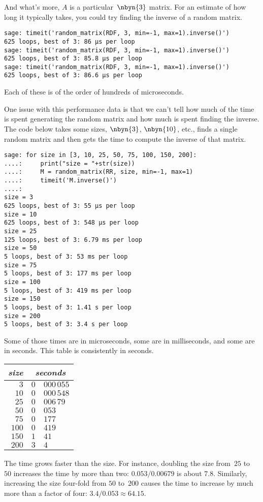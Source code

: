 And what's more, $A$ is a particular~$\nbyn{3}$ matrix. 
For an estimate of
how long it typically takes,
you could try finding the inverse of a random matrix.
\begin{lstlisting}
sage: timeit('random_matrix(RDF, 3, min=-1, max=1).inverse()')
625 loops, best of 3: 86 μs per loop
sage: timeit('random_matrix(RDF, 3, min=-1, max=1).inverse()')
625 loops, best of 3: 85.8 μs per loop
sage: timeit('random_matrix(RDF, 3, min=-1, max=1).inverse()')
625 loops, best of 3: 86.6 μs per loop
\end{lstlisting}
Each of these is of the order of hundreds of microseconds.

One issue with this performance data is that
we can't tell
how much of the time is spent generating
the random matrix and how much is spent finding the inverse.
The code below takes some sizes, $\nbyn{3}$, $\nbyn{10}$, etc.,
finds a single random matrix and then 
gets the time to compute the inverse of that matrix.
\begin{lstlisting}
sage: for size in [3, 10, 25, 50, 75, 100, 150, 200]:
....:     print("size = "+str(size))
....:     M = random_matrix(RR, size, min=-1, max=1)
....:     timeit('M.inverse()')
....:     
size = 3
625 loops, best of 3: 55 μs per loop
size = 10
625 loops, best of 3: 548 μs per loop
size = 25
125 loops, best of 3: 6.79 ms per loop
size = 50
5 loops, best of 3: 53 ms per loop
size = 75
5 loops, best of 3: 177 ms per loop
size = 100
5 loops, best of 3: 419 ms per loop
size = 150
5 loops, best of 3: 1.41 s per loop
size = 200
5 loops, best of 3: 3.4 s per loop
\end{lstlisting}
Some of those times are in microseconds, some are in milliseconds, and some
are in seconds.
This table is consistently in seconds.
\begin{center}
  \begin{tabular}{r|r@{.}l}
    \textit{size}     &\multicolumn{2}{c}{\textit{seconds}}  \\  \hline
    $3$      &$0$ &$000\,055$ \\
    $10$     &$0$ &$000\,548$ \\
    $25$     &$0$ &$006\,79$ \\
    $50$     &$0$ &$053$ \\
    $75$     &$0$ &$177$ \\
    $100$    &$0$ &$419$ \\
    $150$    &$1$ &$41$ \\
    $200$    &$3$ &$4$ 
  \end{tabular}
\end{center}
The time grows faster than the size.
For instance, doubling the size from~$25$ to~$50$ increases the time by
more than two: $0.053/0.00679$ is about $7.8$.
Similarly, increasing the size four-fold from $50$ to~$200$ causes the time to 
increase by much more than a factor of four: $3.4/0.053\approx 64.15$. 


